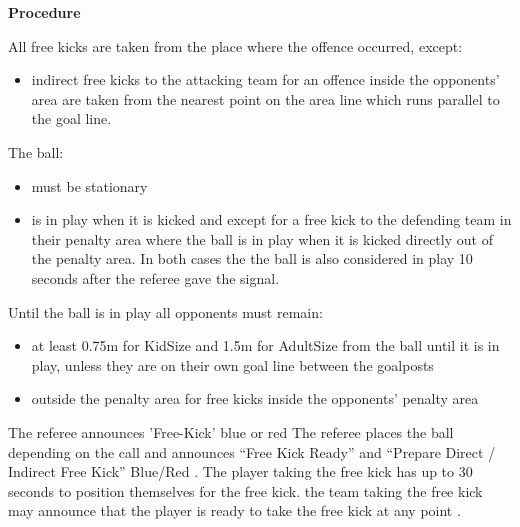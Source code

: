 {\bfseries Procedure}

\headlinebox

All free kicks are taken from the place where the offence occurred, except:
\begin{itemize}
\item indirect free kicks to the attacking team for an offence inside the
  opponents'  area are taken from the nearest point
  on the  area line which runs parallel to the goal
  line.
\end{itemize}

The ball:
\begin{itemize}
\item must be stationary 
\item is in play when it is kicked and   except for a free kick to the defending team in their penalty area
      where the ball is in play when it is kicked directly out of the penalty area.
      In both cases the the ball is also considered in play 10 seconds
      after the referee gave the signal.
\end{itemize}

Until the ball is in play all opponents must remain:
\begin{itemize}
\item at least 0.75m for KidSize and 1.5m for AdultSize
       from the ball until it is in play,
      unless they are on their own goal line between the goalposts 
\item outside the penalty area for free kicks inside the opponents' penalty area
\end{itemize}

The referee announces 'Free-Kick' blue or
red%
The referee places the ball depending on the call and announces
``Free Kick Ready'' and 
``Prepare Direct / Indirect Free Kick'' Blue/Red .
The player taking the free kick has up to 30 seconds to position themselves for
the free kick.
 the team taking the free kick may announce that the
player is ready to take the free kick at any point .

